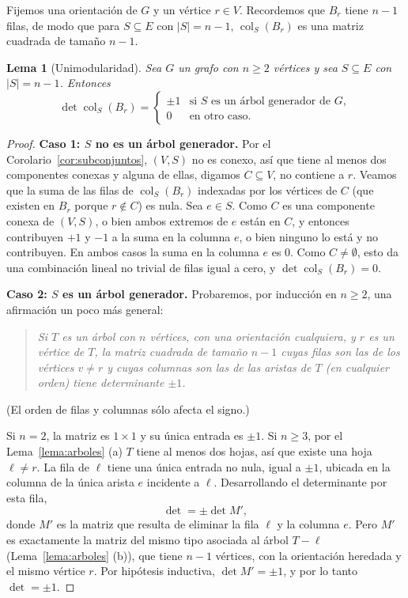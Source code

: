 \documentclass[12pt,a4paper]{article}
\theoremstyle{profesional}
\newtheorem{lemma}[teorema]{Lema}
\theoremstyle{definicion-style}
\theoremstyle{observacion-style}
\newcommand{\abs}[1]{\left| #1 \right|}
\newcommand{\colS}[2]{\operatorname{col}_{#2}(#1)}
\begin{document}
Fijemos una orientación de \( G \) y un vértice \( r \in V \). Recordemos que \( B_r \) tiene \( n - 1 \) filas, de modo que para \( S \subseteq E \) con \( \abs{S} = n - 1 \), \( \colS{B_r}{S} \) es una matriz cuadrada de tamaño \( n - 1 \).

\begin{lemma}[Unimodularidad]\label{lema:unimod}
    Sea \( G \) un grafo con \( n \geq 2 \) vértices y sea \( S \subseteq E \) con \( \abs{S} = n - 1 \). Entonces
    \[
        \det \colS{B_r}{S} = \begin{cases}
            \pm 1 & \text{si } S \text{ es un árbol generador de } G, \\
            0     & \text{en otro caso.}
        \end{cases}
    \]
\end{lemma}
\begin{proof}
    \textbf{Caso 1: \( S \) no es un árbol generador.} Por el Corolario~\ref{cor:subconjuntos}, \( (V, S) \) no es conexo, así que tiene al menos dos componentes conexas y alguna de ellas, digamos \( C \subseteq V \), no contiene a \( r \).
    Veamos que la suma de las filas de \( \colS{B_r}{S} \) indexadas por los vértices de \( C \) (que existen en \( B_r \) porque \( r \notin C \)) es nula.
    Sea \( e \in S \). Como \( C \) es una componente conexa de \( (V, S) \), o bien ambos extremos de \( e \) están en \( C \), y entonces contribuyen \( +1 \) y \( -1 \) a la suma en la columna \( e \), o bien ninguno lo está y no contribuyen. En ambos casos la suma en la columna \( e \) es \( 0 \).
    Como \( C \neq \emptyset \), esto da una combinación lineal no trivial de filas igual a cero, y \( \det \colS{B_r}{S} = 0 \).

    \textbf{Caso 2: \( S \) es un árbol generador.} Probaremos, por inducción en \( n \geq 2 \), una afirmación un poco más general:
    \begin{quote}
        \emph{Si \( T \) es un árbol con \( n \) vértices, con una orientación cualquiera, y \( r \) es un vértice de \( T \), la matriz cuadrada de tamaño \( n - 1 \) cuyas filas son las de los vértices \( v \neq r \) y cuyas columnas son las de las aristas de \( T \) (en cualquier orden) tiene determinante \( \pm 1 \).}
    \end{quote}
    (El orden de filas y columnas sólo afecta el signo.)

    Si \( n = 2 \), la matriz es \( 1 \times 1 \) y su única entrada es \( \pm 1 \). Si \( n \geq 3 \), por el Lema~\ref{lema:arboles} (a) \( T \) tiene al menos dos hojas, así que existe una hoja \( \ell \neq r \).
    La fila de \( \ell \) tiene una única entrada no nula, igual a \( \pm 1 \), ubicada en la columna de la única arista \( e \) incidente a \( \ell \). Desarrollando el determinante por esta fila,
    \[
        \det = \pm \det M',
    \]
    donde \( M' \) es la matriz que resulta de eliminar la fila \( \ell \) y la columna \( e \). Pero \( M' \) es exactamente la matriz del mismo tipo asociada al árbol \( T - \ell \) (Lema~\ref{lema:arboles} (b)), que tiene \( n - 1 \) vértices, con la orientación heredada y el mismo vértice \( r \).
    Por hipótesis inductiva, \( \det M' = \pm 1 \), y por lo tanto \( \det = \pm 1 \).
\end{proof}
\end{document}
